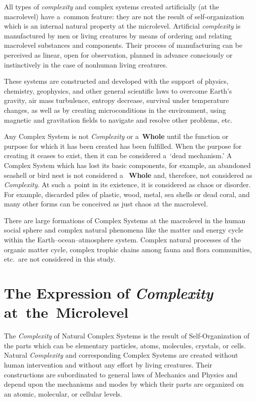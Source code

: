 \begin{multicols}{2}
All types of \textit{complexity} and complex systems created artificially (at the 
macrolevel) have 
a~common feature: they are not the result of self-organization which is an internal natural 
property at the microlevel. Artificial \textit{complexity} is manufactured by men or living 
creatures by means of ordering and relating macrolevel substances and components. Their 
process of manufacturing can be perceived as linear, open for observation, planned 
in advance consciously or instinctively in the case of nonhuman living creatures. 

These systems are constructed and developed with the support of physics, chemistry, 
geophysics,
and other general scientific laws to overcome Earth's gravity, air mass turbulence, entropy 
decrease, survival under temperature changes, as well as by creating microconditions in the 
environment, using magnetic and gravitation fields to navigate and resolve other problems, etc. 

Any Complex System is not \textit{Complexity} or a~\textbf{Whole} until the function or 
purpose for which it has been created has been fulfilled. When the purpose for creating it ceases 
to exist, then it can be considered a~`dead mechanism.' A Complex System which has lost its 
basic components, for example, an abandoned seashell or bird nest is not considered a~
\textbf{Whole} and, therefore, not considered as \textit{Complexity}. At such a~point in its 
existence, it is considered as chaos or disorder.  For example, discarded piles of plastic, wood, 
metal, sea shells or dead coral, and many other forms can be conceived as just chaos at the 
macrolevel. 

There are large formations of Complex Systems at the macrolevel in the human social sphere 
and complex natural phenomena like the matter and energy cycle within the 
Earth--ocean--atmosphere system. Complex natural processes of the organic matter cycle, complex trophic 
chains among fauna and flora communities, etc.\ are not considered in this 
study.

\section*{The Expression of \textit{Complexity} at~the~Microlevel}

\vspace*{3pt}

\noindent
The \textit{Complexity} of Natural Complex Systems is the result of Self-Organization of the 
parts which can be elementary particles, atoms, molecules, crystals, or cells. Natural 
\textit{Complexity} and corresponding Complex Systems are created without human intervention 
and without any effort by living creatures. Their constructions are subordinated
 to general laws of 
Mechanics and Physics and depend upon the mechanisms and modes by which their parts are 
organized on an atomic, molecular, or cellular levels. 


\end{multicols}
